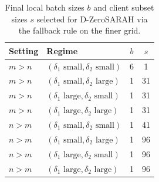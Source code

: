 \documentclass{article}
\theoremstyle{plain}
\newcommand{\algname}[1]{{\sf\scalefont{0.88}\color{mydarkgreen}#1}\xspace}
\def\algname#1{#1}%
\begin{document}
\begin{table}[t]
\centering
\small
\setlength{\tabcolsep}{5pt}
\caption{Final local batch sizes $b$ and client subset sizes $s$ selected for \algname{D-ZeroSARAH} via the fallback rule on the finer grid.}
\begin{tabular}{llcc}
\toprule
\textbf{Setting} & \textbf{Regime} & $b$ & $s$ \\
\midrule
$m>n$ & $(\delta_1 \text{ small}, \delta_2 \text{ small})$ & 6 & 1 \\
$m>n$ & $(\delta_1 \text{ small}, \delta_2 \text{ large})$ & 1 & 31 \\
$m>n$ & $(\delta_1 \text{ large}, \delta_2 \text{ small})$ & 1 & 31 \\
$m>n$ & $(\delta_1 \text{ large}, \delta_2 \text{ large})$ & 1 & 31 \\
\midrule
$n>m$ & $(\delta_1 \text{ small}, \delta_2 \text{ small})$ & 1 & 41 \\
$n>m$ & $(\delta_1 \text{ small}, \delta_2 \text{ large})$ & 1 & 96 \\
$n>m$ & $(\delta_1 \text{ large}, \delta_2 \text{ small})$ & 1 & 96 \\
$n>m$ & $(\delta_1 \text{ large}, \delta_2 \text{ large})$ & 1 & 96 \\
\bottomrule
\end{tabular}
\end{table}
\end{document}
